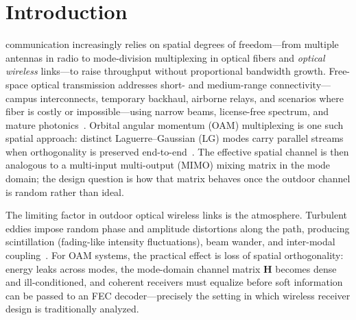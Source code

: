 \documentclass[journal]{IEEEtran}
\begin{document}
\section{Introduction}
\label{sec:intro}

 communication increasingly relies on spatial degrees of freedom---from multiple antennas in radio to mode-division multiplexing in optical fibers and \emph{optical wireless} links---to raise throughput without proportional bandwidth growth. Free-space optical transmission addresses short- and medium-range connectivity---campus interconnects, temporary backhaul, airborne relays, and scenarios where fiber is costly or impossible---using narrow beams, license-free spectrum, and mature photonics~\cite{khalighi2014survey, kaushal2016optical}. Orbital angular momentum (OAM) multiplexing is one such spatial approach: distinct Laguerre--Gaussian (LG) modes carry parallel streams when orthogonality is preserved end-to-end~\cite{allen1992orbital, wang2012terabit, willner2015optical}. The effective spatial channel is then analogous to a multi-input multi-output (MIMO) mixing matrix in the mode domain; the design question is how that matrix behaves once the outdoor channel is random rather than ideal.

The limiting factor in outdoor optical wireless links is the atmosphere. Turbulent eddies impose random phase and amplitude distortions along the path, producing scintillation (fading-like intensity fluctuations), beam wander, and inter-modal coupling~\cite{andrews2005laser, paterson2005atmospheric, ren2013atmospheric}. For OAM systems, the practical effect is loss of spatial orthogonality: energy leaks across modes, the mode-domain channel matrix $\mathbf{H}$ becomes dense and ill-conditioned, and coherent receivers must equalize before soft information can be passed to an FEC decoder---precisely the setting in which wireless receiver design is traditionally analyzed.
\end{document}
